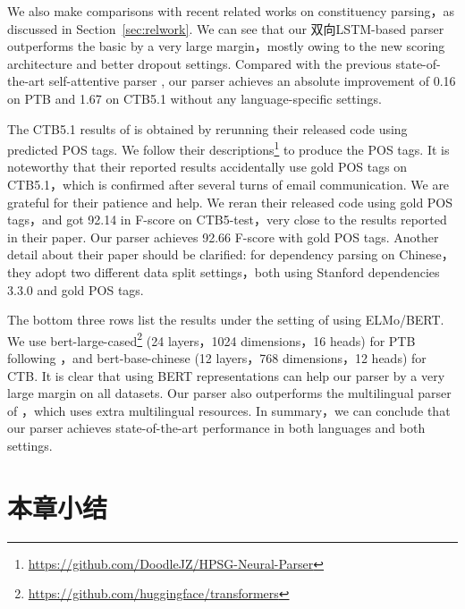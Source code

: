 We also make comparisons with recent related works on constituency parsing，as discussed in Section~\ref{sec:relwork}.
We can see that our 双向LSTM-based parser outperforms the basic \cite{stern-etal-2017-minimal} by a very large margin，mostly owing to the new scoring architecture and better dropout settings.
Compared with the previous state-of-the-art self-attentive parser \cite{kitaev-klein-2018-constituency},
our parser achieves an absolute improvement of 0.16 on PTB and 1.67 on CTB5.1 without any language-specific settings.

The CTB5.1 results of \cite{zhou-zhao-2019-head} is obtained by rerunning their released code using predicted POS tags.
We follow their descriptions\footnote{\url{https://github.com/DoodleJZ/HPSG-Neural-Parser}} to produce the POS tags.
It is noteworthy that their reported results accidentally use gold POS tags on CTB5.1，which is confirmed after several turns of email communication. We are grateful for their patience and help.
We reran their released code using gold POS tags，and got 92.14 in F-score on CTB5-test，very close to the results reported in their paper.
Our parser achieves 92.66 F-score with gold POS tags.
Another detail about their paper should be clarified: for dependency parsing on Chinese，they adopt two different data split settings，both using Stanford dependencies 3.3.0 and gold POS tags.

The bottom three rows list the results under the setting of using ELMo/BERT.
We use bert-large-cased\footnote{\url{https://github.com/huggingface/transformers}} (24 layers，1024 dimensions，16 heads) for PTB following \cite{kitaev-etal-2019-multilingual}，and bert-base-chinese (12 layers，768 dimensions，12 heads) for CTB.
It is clear that using BERT representations can help our parser by a very large margin on all datasets. %
Our parser also outperforms the multilingual parser of \cite{kitaev-etal-2019-multilingual}，which uses extra multilingual resources.
In summary，we can conclude that our parser achieves state-of-the-art performance in both languages and both settings.

\section{本章小结}\label{sec:con-conclusions}

